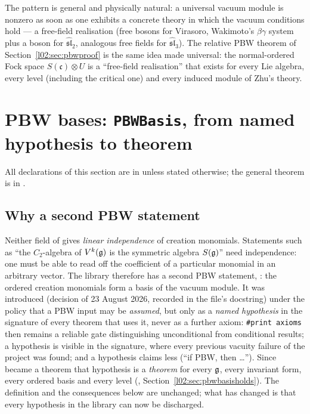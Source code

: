 \begin{physics}
The pattern is general and physically natural: a universal vacuum module is nonzero as soon as one
exhibits a concrete theory in which the vacuum conditions hold --- a free-field realisation (free
bosons for Virasoro, Wakimoto's $\beta\gamma$ system plus a boson for $\widehat{\mathfrak{sl}}_2$, analogous
free fields for $\widehat{\mathfrak{sl}}_3$). The relative PBW theorem of Section~\ref{l02:sec:pbwproof} is the
same idea made universal: the normal-ordered Fock space $S(\mathfrak c)\otimes U$ is a ``free-field
realisation'' that exists for every Lie algebra, every level (including the critical one) and every
induced module of Zhu's theory.
\end{physics}

\section{PBW bases: \texorpdfstring{\texttt{PBWBasis}}{PBWBasis}, from named hypothesis to theorem}\label{l02:sec:pbwbasis}

All declarations of this section are in 
unless stated otherwise; the general theorem  is in
.

\subsection{Why a second PBW statement}

Neither field of  gives \emph{linear independence} of creation monomials. Statements
such as ``the $C_2$-algebra of $V^k(\mathfrak{g})$ is the symmetric algebra $S(\mathfrak{g})$'' need independence: one
must be able to read off the coefficient of a particular monomial in an arbitrary vector. The library
therefore has a second PBW statement, : the ordered creation monomials form a basis of the
vacuum module. It was introduced (decision of 23 August 2026, recorded in the file's docstring) under the
policy that a PBW input may be \emph{assumed}, but only as a \emph{named hypothesis} in the signature of
every theorem that uses it, never as a further axiom: \texttt{\#print axioms} then remains a reliable gate
distinguishing unconditional from conditional results; a hypothesis is visible in the signature, where
every previous vacuity failure of the project was found; and a hypothesis claims less (``if PBW, then
\ldots''). Since  became a theorem that hypothesis is a \emph{theorem} for every $\mathfrak{g}$, every
invariant form, every ordered basis and every level (,
Section~\ref{l02:sec:pbwbasisholds}). The definition and the consequences below are unchanged; what has
changed is that every hypothesis  in the library can now be discharged.

